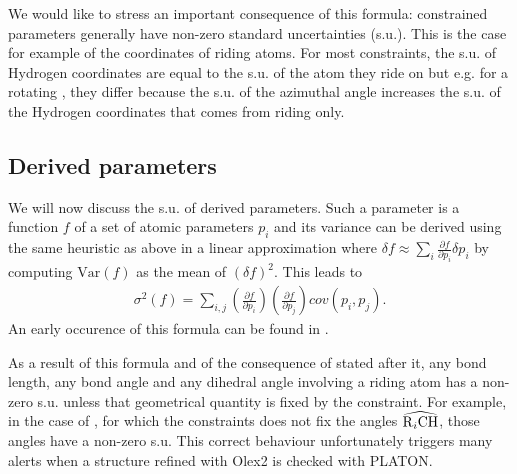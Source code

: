 \documentclass[pdf]{iucr}
\newcommand{\var}[1]{\mathrm{Var}\left(#1\right)}
\newcommand{\partialder}[2]{\frac{\partial #1}{\partial #2}}
\begin{document}
We would like to stress an important consequence of this formula: constrained parameters generally have non-zero standard uncertainties (s.u.). This is the case for example of the coordinates of riding atoms. For most constraints, the s.u. of Hydrogen coordinates are equal to the s.u. of the atom they ride on but e.g. for a rotating , they differ because the s.u. of the azimuthal angle increases the s.u. of the Hydrogen coordinates that comes from riding only.

\subsection{Derived parameters}

We will now discuss the s.u. of derived parameters. Such a parameter is a function $f$ of a set of atomic parameters $p_i$ and its variance can be derived using the same heuristic as above in a linear approximation where $\delta f \approx \sum_i \partialder{f}{p_i} \delta p_i$ by computing $\var{f}$ as the mean of $(\delta f)^2$. This leads to
\begin{align}
\sigma^2(f) = \sum_{i,j}{\left(\partialder{f}{p_i}\right) \left(\partialder{f}{p_j}\right) cov(p_i,p_j)}.
\label{eqn:sigma_f}
\end{align}
An early occurence of this formula can be found in .

As a result of this formula and of the consequence of  stated after it, any bond length, any bond angle and any dihedral angle involving a riding atom has a non-zero s.u. unless that geometrical quantity is fixed by the constraint. For example, in the case of , for which the constraints does not fix the angles $\widehat{\ce{R$_i$CH}}$, those angles have a non-zero s.u. This correct behaviour unfortunately triggers many alerts when a structure refined with Olex2 is checked with PLATON. 
\end{document}
